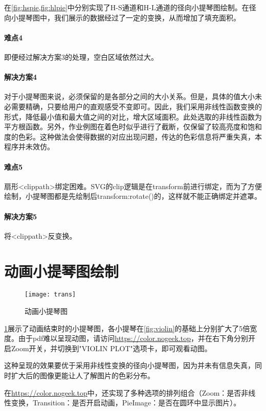 \documentclass[a4paper,12pt]{article}
\begin{document}
    在\cref{fig:hspie,fig:hlpie}中分别实现了H-S通道和H-L通道的径向小提琴图绘制。在径向小提琴图中，我们展示的数据经过了一定的变换，从而增加了填充面积。

    \paragraph{难点4} 即便经过解决方案3的处理，空白区域依然过大。
    \paragraph{解决方案4} 对于小提琴图来说，必须保留的是各部分之间的大小关系。但是，具体的值大小未必需要精确，只要给用户的直观感受不变即可。因此，我们采用非线性函数变换的形式，降低最小值和最大值之间的对比，增大区域面积。此处选取的非线性函数为平方根函数。另外，作业例图在着色时似乎进行了截断，仅保留了较高亮度和饱和度的色彩。这种做法会使得数据的对应出现问题，传达的色彩信息将严重失真，本程序并未效仿。

    \paragraph{难点5} 扇形<clippath>绑定困难。SVG的clip逻辑是在transform前进行绑定，而为了方便绘制，小提琴图都是先绘制后transform:rotate()的，这样就不能正确绑定并遮罩。
    \paragraph{解决方案5} 将<clippath>反变换。
    \section{动画小提琴图绘制}
    \begin{figure}[htbp]
      \centering
      \texttt{[image: trans]}
      \caption{动画小提琴图}
      \label{fig:trans}
    \end{figure}

    \cref{fig:trans}展示了动画结束时的小提琴图，各小提琴在\cref{fig:violin}的基础上分别扩大了5倍宽度。由于pdf难以呈现动图，请访问\url{https://color.nogeek.top}，并在右下角分别开启Zoom开关，并切换到"VIOLIN PLOT"选项卡，即可观看动图。

    这种呈现的效果要优于采用非线性变换的径向小提琴图，因为并未有信息失真，同时扩大后的图像更能让人了解图片的色彩分布。

    在\url{https://color.nogeek.top}中，还实现了多种选项的排列组合（Zoom：是否非线性变换，Transition：是否开启动画，PieImage：是否在圆环中显示图片）。

    \label{applastpage}
    \newpage
    
    
\iffalse
\begin{itemize}[noitemsep,topsep=0pt]
\end{itemize}
\begin{enumerate}[label=\Roman{*}.,noitemsep,topsep=0pt]
\end{enumerate}
\begin{multicols}{2}
\end{multicols}
\fi
\end{document}
